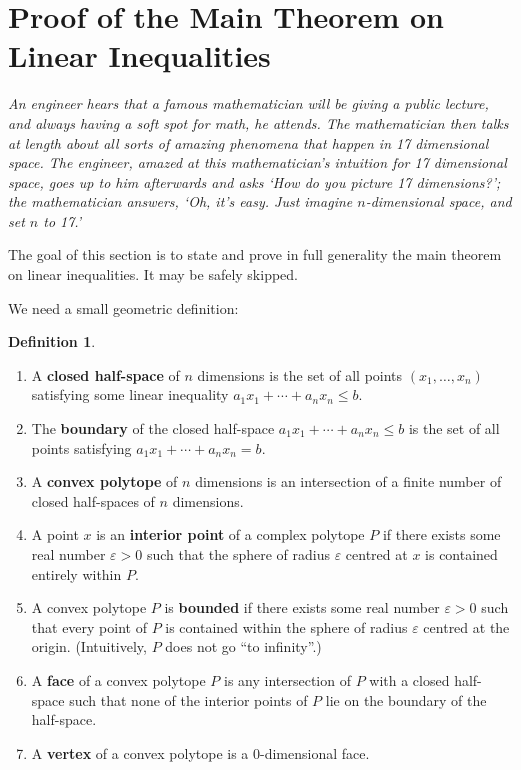 \documentclass[a4paper,leqno]{article}
\numberwithin{equation}{section}
\theoremstyle{definition}
\newtheorem{defn}[equation]{Definition}
\theoremstyle{remark}
\begin{document}
\section{Proof of the Main Theorem on Linear Inequalities}
\begin{center}
  \emph{An engineer hears that a famous mathematician will be giving a public lecture, and always having a soft spot for math,
        he attends. The mathematician then talks at length about all sorts of amazing phenomena that happen in 17 dimensional space.
        The engineer, amazed at this mathematician's intuition for 17 dimensional space, goes up to him afterwards and asks `How do you
        picture 17 dimensions?'; the mathematician answers, `Oh, it's easy. Just imagine $n$-dimensional space, and set $n$ to 17.'}
\end{center}
The goal of this section is to state and prove in full generality the main theorem on linear inequalities. It may be safely skipped.

We need a small geometric definition:
\begin{defn}\leavevmode
  \begin{enumerate}
    \item A \textbf{closed half-space} of $ n $ dimensions is the set of all points $ (x_1, \dots, x_n) $ satisfying some linear
          inequality $ a_1 x_1 + \cdots + a_n x_n \leq b $.
    \item The \textbf{boundary} of the closed half-space $ a_1 x_1 + \cdots + a_n x_n \leq b $ is the set of all points
          satisfying $ a_1 x_1 + \cdots + a_n x_n = b $.
    \item A \textbf{convex polytope} of $ n $ dimensions is an intersection of a finite number of closed half-spaces of $ n $ dimensions.
    \item A point $ x$ is an \textbf{interior point} of a complex polytope $ P $ if there exists some real number $ \varepsilon > 0 $ such that the sphere
          of radius $ \varepsilon $ centred at $ x $ is contained entirely within $ P $.
    \item A convex polytope $ P $ is \textbf{bounded} if there exists some real number $ \varepsilon > 0 $ such that every point of $ P $ is contained within
          the sphere of radius $ \varepsilon $  centred at the origin. (Intuitively, $ P $ does not go ``to infinity''.)
    \item A \textbf{face} of a convex polytope $ P $ is any intersection of $ P $ with a closed half-space such that none of the interior points of $ P $
          lie on the boundary of the half-space.
    \item A \textbf{vertex} of a convex polytope is a 0-dimensional face.
  \end{enumerate}
\end{defn}
\end{document}
